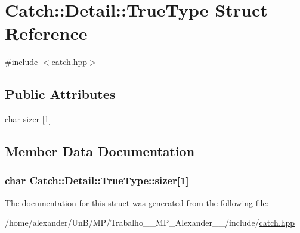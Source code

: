 \hypertarget{structCatch_1_1Detail_1_1TrueType}{\section{Catch\-:\-:Detail\-:\-:True\-Type Struct Reference}
\label{structCatch_1_1Detail_1_1TrueType}
}


{\ttfamily \#include $<$catch.\-hpp$>$}

\subsection*{Public Attributes}
\begin{DoxyCompactItemize}
\item 
char \hyperlink{structCatch_1_1Detail_1_1TrueType_a3aaaeb75909e668b293c8a81f5fb6419}{sizer} \mbox{[}1\mbox{]}
\end{DoxyCompactItemize}


\subsection{Member Data Documentation}
\hypertarget{structCatch_1_1Detail_1_1TrueType_a3aaaeb75909e668b293c8a81f5fb6419}{
\subsubsection[{sizer}]{\setlength{\rightskip}{0pt plus 5cm}char Catch\-::\-Detail\-::\-True\-Type\-::sizer\mbox{[}1\mbox{]}}}\label{structCatch_1_1Detail_1_1TrueType_a3aaaeb75909e668b293c8a81f5fb6419}


The documentation for this struct was generated from the following file\-:\begin{DoxyCompactItemize}
\item 
/home/alexander/\-Un\-B/\-M\-P/\-Trabalho\-\_\-\_\-\-M\-P\-\_\-\-Alexander\-\_\-\_/include/\hyperlink{catch_8hpp}{catch.\-hpp}\end{DoxyCompactItemize}
